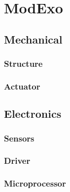 \chapter{ModExo}
\label{ch:ModExo}

\section{Mechanical}
\subsection{Structure}

\subsection{Actuator}

\section{Electronics}
\subsection{Sensors}

\subsection{Driver}

\subsection{Microprocessor}